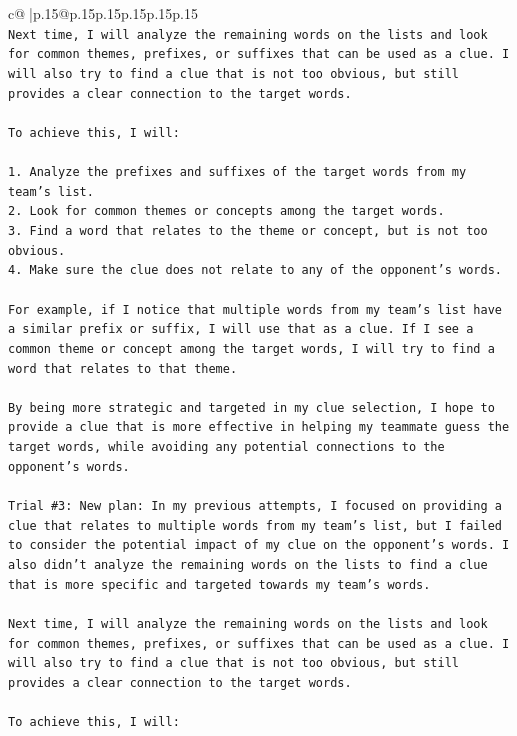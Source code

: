 \documentclass{article}
\begin{document}
{\begin{supertabular}{c@{$\;$}|p{.15\linewidth}@{}p{.15\linewidth}p{.15\linewidth}p{.15\linewidth}p{.15\linewidth}p{.15\linewidth}}
{{{\\ 
\texttt{Next time, I will analyze the remaining words on the lists and look for common themes, prefixes, or suffixes that can be used as a clue. I will also try to find a clue that is not too obvious, but still provides a clear connection to the target words.} \\
\\ 
\texttt{To achieve this, I will:} \\
\\ 
\texttt{1. Analyze the prefixes and suffixes of the target words from my team's list.} \\
\texttt{2. Look for common themes or concepts among the target words.} \\
\texttt{3. Find a word that relates to the theme or concept, but is not too obvious.} \\
\texttt{4. Make sure the clue does not relate to any of the opponent's words.} \\
\\ 
\texttt{For example, if I notice that multiple words from my team's list have a similar prefix or suffix, I will use that as a clue. If I see a common theme or concept among the target words, I will try to find a word that relates to that theme.} \\
\\ 
\texttt{By being more strategic and targeted in my clue selection, I hope to provide a clue that is more effective in helping my teammate guess the target words, while avoiding any potential connections to the opponent's words.} \\
\\ 
\texttt{Trial \#3: New plan: In my previous attempts, I focused on providing a clue that relates to multiple words from my team's list, but I failed to consider the potential impact of my clue on the opponent's words. I also didn't analyze the remaining words on the lists to find a clue that is more specific and targeted towards my team's words.} \\
\\ 
\texttt{Next time, I will analyze the remaining words on the lists and look for common themes, prefixes, or suffixes that can be used as a clue. I will also try to find a clue that is not too obvious, but still provides a clear connection to the target words.} \\
\\ 
\texttt{To achieve this, I will:} \\
\\ 
}}}
\end{supertabular}}
\end{document}
